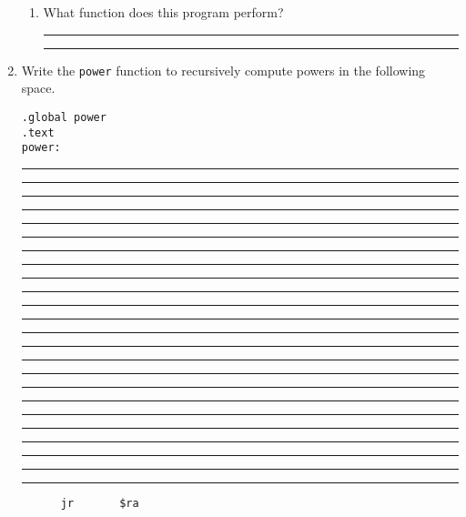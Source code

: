 \documentclass[a4paper,10pt]{article}
\begin{document}
\begin{enumerate}
\begin{enumerate}
\item What function does this program perform?
\vspace{3mm}\hrule\vspace{7mm}\hrule\vspace{3mm}

\end{enumerate}

\newpage
\item Write the \texttt{power} function to recursively compute powers in the following space.
\vspace{5mm}
\begin{large}
\texttt{.global power}\vspace{2mm}\\
\texttt{.text}\vspace{2mm}\\
\texttt{power:}
\end{large}
\vspace{7mm}\hrule\vspace{7mm}\hrule\vspace{7mm}\hrule\vspace{7mm}\hrule
\vspace{7mm}\hrule\vspace{7mm}\hrule\vspace{7mm}\hrule\vspace{7mm}\hrule
\vspace{7mm}\hrule\vspace{7mm}\hrule\vspace{7mm}\hrule\vspace{7mm}\hrule
\vspace{7mm}\hrule\vspace{7mm}\hrule\vspace{7mm}\hrule\vspace{7mm}\hrule
\vspace{7mm}\hrule\vspace{7mm}\hrule\vspace{7mm}\hrule\vspace{7mm}\hrule
\vspace{7mm}\hrule\vspace{7mm}\hrule\vspace{7mm}\hrule\vspace{7mm}\hrule
\vspace{3mm}
\begin{large}
\begin{verbatim}
      jr       $ra
\end{verbatim}
\end{large}


\end{enumerate}
\end{document}
